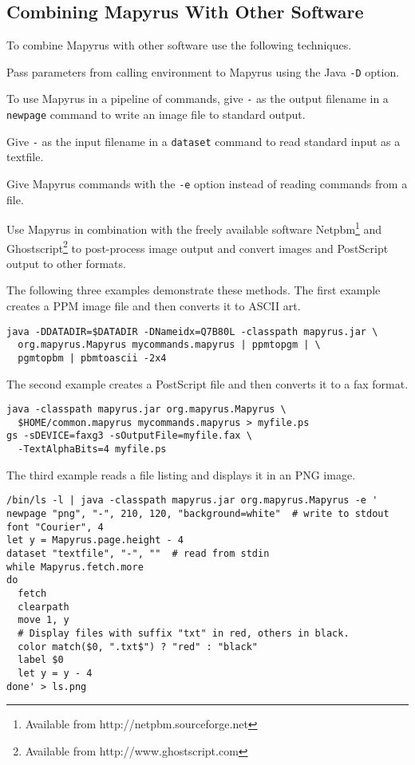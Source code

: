 \subsection{Combining Mapyrus With Other Software}

To combine Mapyrus with other software use the following
techniques.

Pass parameters from calling environment to Mapyrus using the Java
\texttt{-D} option.

To use Mapyrus in a pipeline of commands,
give \texttt{-} as the output filename in a
\texttt{newpage}
command to write an image file to standard output.

Give \texttt{-} as the input filename in a
\texttt{dataset}
command to read standard input as a textfile.

Give Mapyrus commands with the \texttt{-e} option
instead of reading commands from a file.

Use Mapyrus in combination with the freely available software
Netpbm\footnote{Available from http://netpbm.sourceforge.net} and
Ghostscript\footnote{Available from http://www.ghostscript.com} to post-process
image output and convert images and PostScript output to other formats.

The following three examples demonstrate these methods.
The first example creates a PPM image file and then converts it to ASCII art.

\begin{verbatim}
java -DDATADIR=$DATADIR -DNameidx=Q7B80L -classpath mapyrus.jar \
  org.mapyrus.Mapyrus mycommands.mapyrus | ppmtopgm | \
  pgmtopbm | pbmtoascii -2x4
\end{verbatim}

The second example creates a PostScript file and then converts it
to a fax format.

\begin{verbatim}
java -classpath mapyrus.jar org.mapyrus.Mapyrus \
  $HOME/common.mapyrus mycommands.mapyrus > myfile.ps
gs -sDEVICE=faxg3 -sOutputFile=myfile.fax \
  -TextAlphaBits=4 myfile.ps
\end{verbatim}

The third example reads a file listing and displays it in an
PNG image.

\begin{verbatim}
/bin/ls -l | java -classpath mapyrus.jar org.mapyrus.Mapyrus -e '
newpage "png", "-", 210, 120, "background=white"  # write to stdout
font "Courier", 4
let y = Mapyrus.page.height - 4
dataset "textfile", "-", ""  # read from stdin
while Mapyrus.fetch.more
do
  fetch 
  clearpath
  move 1, y
  # Display files with suffix "txt" in red, others in black.
  color match($0, ".txt$") ? "red" : "black"
  label $0
  let y = y - 4
done' > ls.png
\end{verbatim}

